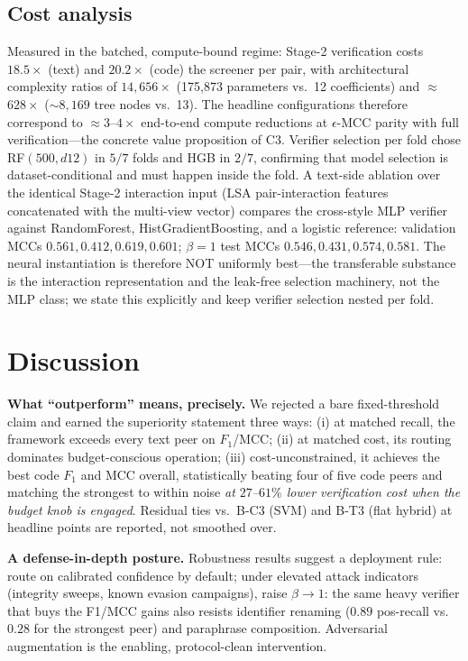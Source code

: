\documentclass[conference]{IEEEtran}
\newcommand{\fone}{F_{1}}
\begin{document}
\subsection{Cost analysis}
\label{sec:costs}
Measured in the batched, compute-bound regime: Stage-2 verification costs $18.5\times$ (text) and
$20.2\times$ (code) the screener per pair, with architectural complexity ratios of $14{,}656\times$
(175{,}873 parameters vs.\ 12 coefficients) and $\approx$$628\times$ ($\sim$$8{,}169$ tree nodes
vs.\ 13). The headline configurations therefore correspond to $\approx$$3$--$4\times$ end-to-end
compute reductions at $\epsilon$-MCC parity with full verification---the concrete value
proposition of C3. Verifier selection per fold chose RF$(500,\!d12)$ in $5/7$ folds and HGB in
$2/7$, confirming that model selection is dataset-conditional and must happen inside the fold.
A text-side ablation over the identical Stage-2 interaction input (LSA pair-interaction
features concatenated with the multi-view vector) compares the cross-style MLP verifier
against RandomForest, HistGradientBoosting, and a logistic reference: validation MCCs
$0.561, 0.412, 0.619, 0.601$; $\beta{=}1$ test MCCs $0.546, 0.431, 0.574, 0.581$.
The neural instantiation is therefore NOT uniformly best---the transferable substance is the
interaction representation and the leak-free selection machinery, not the MLP class; we state
this explicitly and keep verifier selection nested per fold.

\section{Discussion}
\label{sec:discussion}

\textbf{What ``outperform'' means, precisely.} We rejected a bare fixed-threshold claim and earned
the superiority statement three ways: (i) at matched recall, the framework exceeds every text peer
on $\fone$/MCC; (ii) at matched cost, its routing dominates budget-conscious operation; (iii)
cost-unconstrained, it achieves the best code $\fone$ and MCC overall, statistically beating four
of five code peers and matching the strongest to within noise \emph{at $27$--$61\%$ lower
verification cost when the budget knob is engaged}. Residual ties vs.\ B-C3 (SVM) and B-T3 (flat
hybrid) at headline points are reported, not smoothed over.

\textbf{A defense-in-depth posture.} Robustness results suggest a deployment rule: route on
calibrated confidence by default; under elevated attack indicators (integrity sweeps, known evasion
campaigns), raise $\beta\to1$: the same heavy verifier that buys the F1/MCC gains also resists
identifier renaming ($0.89$ pos-recall vs.\ $0.28$ for the strongest peer) and paraphrase
composition. Adversarial augmentation is the enabling, protocol-clean intervention.
\end{document}
